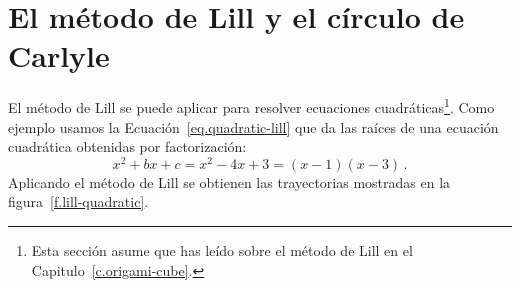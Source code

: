 
\section{El método de Lill y el círculo de Carlyle}\label{s.lill-quadratic}

El método de Lill se puede aplicar para resolver ecuaciones cuadráticas\footnote{Esta sección asume que has leído sobre el método de Lill en el Capitulo~\ref{c.origami-cube}.}. Como ejemplo usamos la Ecuación~\ref{eq.quadratic-lill} que da las raíces de una ecuación cuadrática obtenidas por factorización:
\[
x^2+bx+c=x^2-4x+3= (x-1)(x-3)\,.
\]
Aplicando el método de Lill se obtienen las trayectorias mostradas en la figura~\ref{f.lill-quadratic}.

